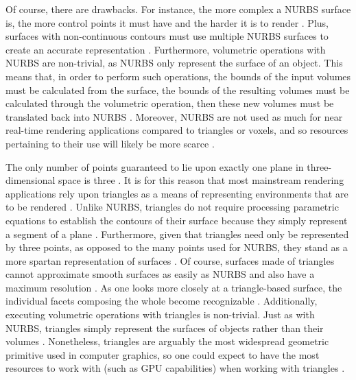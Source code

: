 \documentclass[onecolumn, draftclsnofoot,10pt, compsoc]{IEEEtran}
\newcounter{threesection}[subsubsection]
\begin{document}
Of course, there are drawbacks.
For instance, the more complex a NURBS surface is, the more control points it must have and the harder it is to render \cite{braxTech2}.
Plus, surfaces with non-continuous contours must use multiple NURBS surfaces to create an accurate representation \cite{braxTech1}.
Furthermore, volumetric operations with NURBS are non-trivial, as NURBS only represent the surface of an object. 
This means that, in order to perform such operations, the bounds of the input volumes must be calculated from the surface, the bounds of the resulting volumes must be calculated through the volumetric operation, then these new volumes must be translated back into NURBS \cite{braxTech1}\cite{braxTech2}. 
Moreover, NURBS are not used as much for near real-time rendering applications compared to triangles or voxels, and so resources pertaining to their use will likely be more scarce \cite{braxTech1}.




The only number of points guaranteed to lie upon exactly one plane in three-dimensional space is three \cite{braxTech1}.
It is for this reason that most mainstream rendering applications rely upon triangles as a means of representing environments that are to be rendered \cite{braxTech1}.
Unlike NURBS, triangles do not require processing parametric equations to establish the contours of their surface because they simply represent a segment of a plane \cite{braxTech1}.
Furthermore, given that triangles need only be represented by three points, as opposed to the many points used for NURBS, they stand as a more spartan representation of surfaces \cite{braxTech1}.
Of course, surfaces made of triangles cannot approximate smooth surfaces as easily as NURBS and also have a maximum resolution \cite{braxTech1}.
As one looks more closely at a triangle-based surface, the individual facets composing the whole become recognizable \cite{braxTech1}.
Additionally, executing volumetric operations with triangles is non-trivial. Just as with NURBS, triangles simply represent the surfaces of objects rather than their volumes \cite{braxTech1}.
Nonetheless, triangles are arguably the most widespread geometric primitive used in computer graphics, so one could expect to have the most resources to work with (such as GPU capabilities) when working with triangles \cite{braxTech1}.



\end{document}
